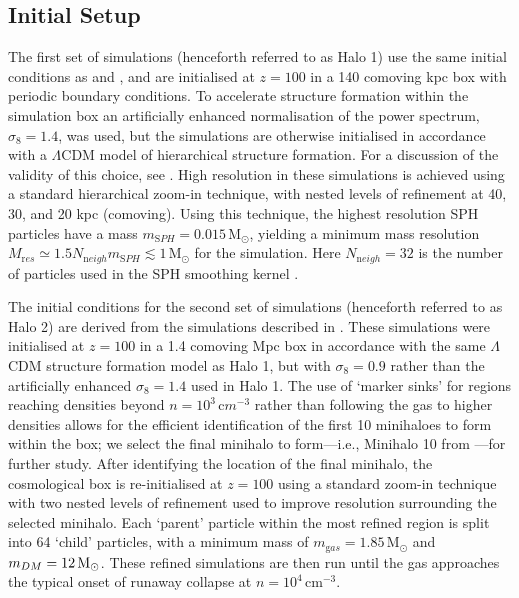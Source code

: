\documentclass{thesis}
\newcommand{\cc}{\ensuremath{\,\mathrm{cm}^{-3}}\xspace}
\newcommand{\msun}{\ensuremath{\,\mathrm{M}_{\odot}}\xspace}
\begin{document}
\subsection{Initial Setup}
\label{setup}
The first set of simulations (henceforth referred to as Halo 1) use the same initial conditions as \citet{Hummeletal2015} and \citet{StacyGreifBromm2010}, and are initialised at $z=100$ in a 140 comoving kpc box with periodic boundary conditions. 
To accelerate structure formation within the simulation box an artificially enhanced normalisation of the power spectrum, $\sigma_8 = 1.4$, was used, but the simulations are otherwise initialised in accordance with a $\Lambda$CDM model of hierarchical structure formation. 
For a discussion of the validity of this choice, see \citet{StacyGreifBromm2010}. 
High resolution in these simulations is achieved using a standard hierarchical zoom-in technique, with nested levels of refinement at 40, 30, and 20 kpc (comoving).  
Using this technique, the highest resolution SPH particles have a mass $m_{\mathrm SPH} = 0.015\msun$, yielding a minimum mass resolution $M_{\mathrm res} \simeq 1.5 N_{\mathrm neigh} m_{\mathrm SPH} \lesssim 1\msun$ for the simulation.  
Here $N_{\mathrm neigh} = 32$ is the number of particles used in the SPH smoothing kernel \citep{BateBurkert1997}.

The initial conditions for the second set of simulations (henceforth referred to as Halo 2) are derived from the simulations described in \citet{StacyBromm2013}.  
These simulations were initialised at $z=100$ in a 1.4 comoving Mpc box in accordance with the same $\Lambda$CDM structure formation model as Halo 1, but with $\sigma_8 = 0.9$ rather than the artificially enhanced $\sigma_8 = 1.4$ used in Halo 1. 
The use of `marker sinks'  for regions reaching densities beyond $n=10^3\,{\mathrm cm}^{-3}$ rather than following the gas to higher densities allows for the efficient identification of the first 10 minihaloes to form within the box; we select the final minihalo to form---i.e., Minihalo 10 from \citet{StacyBromm2013}---for further study.  
After identifying the location of the final minihalo, the cosmological box is re-initialised at $z=100$ using a standard zoom-in technique with two nested levels of refinement used to improve resolution surrounding the selected minihalo.  
Each `parent' particle within the most refined region is split into 64 `child' particles, with a minimum mass of $m_{\mathrm gas}=1.85\msun$ and $m_{\mathrm \small DM}=12\msun$. 
These refined simulations are then run until the gas approaches the typical onset of runaway collapse at $n=10^4\cc$.
\end{document}
